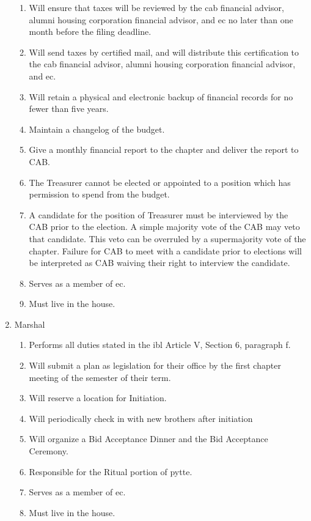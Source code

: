 \begin{enumerate}
\begin{enumerate}
				\item Will ensure that taxes will be reviewed by the \gls{cab} financial advisor, alumni housing corporation financial advisor, and \gls{ec} no later than one month before the filing deadline.
				\item Will send taxes by certified mail, and will distribute this certification to the \gls{cab} financial advisor, alumni housing corporation financial advisor, and \gls{ec}.
				\item Will retain a physical and electronic backup of financial records for no fewer than five years.
                \item Maintain a changelog of the budget.
                \item Give a monthly financial report to the chapter and deliver the report to CAB.
                \item The Treasurer cannot be elected or appointed to a position which has permission
to spend from the budget.
				\item A candidate for the position of Treasurer must be interviewed by the CAB prior to the
election. A simple majority vote of the CAB may veto that candidate. This veto can be overruled
by a supermajority vote of the chapter. Failure for CAB to meet with a candidate prior to
elections will be interpreted as CAB waiving their right to interview the candidate.
				\item Serves as a member of \gls{ec}.
				\item Must live in the house.
			\end{enumerate}

		\item Marshal
			\begin{enumerate}
				\item Performs all duties stated in the \gls{ibl} Article V, Section 6, paragraph f.
				\item Will submit a plan as legislation for their office by the first chapter meeting of the semester of their term.
				\item Will reserve a location for Initiation.
				\item Will periodically check in with new brothers after initiation
                		\item Will organize a Bid Acceptance Dinner and the Bid Acceptance Ceremony.
				\item Responsible for the Ritual portion of \gls{pytte}.
				\item Serves as a member of \gls{ec}.
				\item Must live in the house.
			\end{enumerate}


\end{enumerate}
